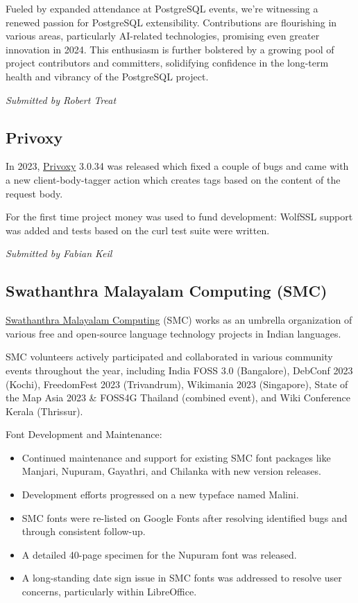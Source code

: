 \documentclass[a4paper]{report}
\begin{document}
Fueled by expanded attendance at PostgreSQL events, we're witnessing a renewed passion for PostgreSQL extensibility. Contributions are flourishing in various areas, particularly AI-related technologies, promising even greater innovation in 2024. This enthusiasm is further bolstered by a growing pool of project contributors and committers, solidifying confidence in the long-term health and vibrancy of the PostgreSQL project.

{\em Submitted by Robert Treat}

\subsection{Privoxy}

In 2023, \href{https://www.privoxy.org/}{Privoxy} 3.0.34 was released which fixed a couple of bugs and came with a new client-body-tagger action which creates tags based on the content of the request body.

For the first time project money was used to fund development: WolfSSL support was added and tests based on the curl test suite were written.

{\em Submitted by Fabian Keil}

\subsection{Swathanthra Malayalam Computing (SMC)}

\href{https://smc.org.in/}{Swathanthra Malayalam Computing} (SMC) works as an umbrella organization of various free and open-source language technology projects in Indian languages.

SMC volunteers actively participated and collaborated in various community events throughout the year, including India FOSS 3.0 (Bangalore), DebConf 2023 (Kochi), FreedomFest 2023 (Trivandrum), Wikimania 2023 (Singapore), State of the Map Asia 2023 \& FOSS4G Thailand (combined event), and Wiki Conference Kerala (Thrissur).

Font Development and Maintenance:

\begin{itemize}

\item Continued maintenance and support for existing SMC font packages like Manjari, Nupuram, Gayathri, and Chilanka with new version releases.

\item Development efforts progressed on a new typeface named Malini.

\item SMC fonts were re-listed on Google Fonts after resolving identified bugs and through consistent follow-up.

\item A detailed 40-page specimen for the Nupuram font was released.

\item A long-standing date sign issue in SMC fonts was addressed to resolve user concerns, particularly within LibreOffice.

\end{itemize}
\end{document}
